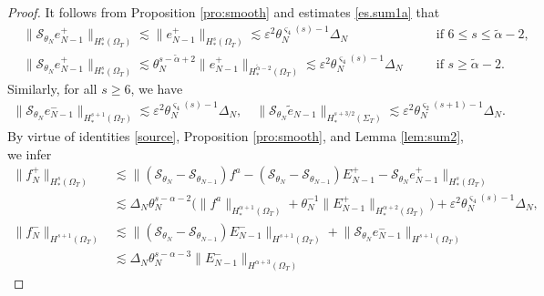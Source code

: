 \documentclass[10pt,a4paper]{amsart}
\begin{document}
\begin{proof}
	It follows from Proposition \ref{pro:smooth} and estimates \eqref{es.sum1a} that
	\begin{align*}
		&	\big\|\mathcal{S}_{\theta_{{N}}} e_{N-1}^+ \big\|_{H_*^s(\Omega_{T})}
		\lesssim 	\big\|  e_{N-1}^+ \big\|_{H_*^s(\Omega_{T})}
		\lesssim \varepsilon^2 \theta_N^{\varsigma_4(s)-1}\varDelta_N
		\quad&& \textrm{if } 6\leq s\leq \widetilde{\alpha}-2,\\
		&	\big\|\mathcal{S}_{\theta_{{N}}} e_{N-1}^+ \big\|_{H_*^s(\Omega_{T})}
		\lesssim \theta_{{N}}^{s-\widetilde{\alpha}+2}	
		\big\|  e_{N-1}^+ \big\|_{H_*^{\widetilde{\alpha}-2}(\Omega_{T})}
		\lesssim \varepsilon^2 \theta_N^{\varsigma_4(s)-1}\varDelta_N
		\quad &&\textrm{if }  s\geq \widetilde{\alpha}-2.
	\end{align*}
	Similarly, for all $s\geq 6$, we have
	\begin{align*}
		\big\|\mathcal{S}_{\theta_{{N}}} e_{N-1}^- \big\|_{H_*^{s+1}(\Omega_{T})}
		\lesssim \varepsilon^2 \theta_N^{\varsigma_4(s)-1}\varDelta_N,
		\quad 	
		\big\|\mathcal{S}_{\theta_{{N}}} \tilde{e}_{N-1}  \big\|_{H_*^{s+3/2}(\Sigma_{T})}
		\lesssim \varepsilon^2 \theta_N^{\varsigma_2(s+1)-1}\varDelta_N.
	\end{align*}
	By virtue of  identities \eqref{source}, Proposition \ref{pro:smooth}, and Lemma \ref{lem:sum2}, we infer
	\begin{align*}
		\big\|f_N^+\big\|_{H_*^{s}(\Omega_{T})}
		&\lesssim
		\big\|(\mathcal{S}_{\theta_{{N}}}-\mathcal{S}_{\theta_{{N}-1}})f^a
		-(\mathcal{S}_{\theta_{{N}}}-\mathcal{S}_{\theta_{{N}-1}})E_{{N}-1}^+
		-\mathcal{S}_{\theta_{{N}}}e_{{N}-1}^+\big\|_{H_*^{s}(\Omega_{T})} \\
		&
		\lesssim \varDelta_{{N}}
		\theta_{{N}}^{s-{\alpha }-2}\big(\big\|f^a\big\|_{H_*^{\alpha +1}(\Omega_{T})}
		+\theta_{{N}}^{-1}\big\|E_{{N}-1}^+\big\|_{H_*^{\alpha +2}(\Omega_{T})} \big)
		+\varepsilon^2 \theta_N^{\varsigma_4(s)-1}\varDelta_N,\\[1mm]
		\big\|f_{{N}}^-\big\|_{H^{s+1}(\Omega_{T})}
		&\lesssim \big\|(\mathcal{S}_{\theta_{{N}}}-\mathcal{S}_{\theta_{{N}-1}})E_{{N}-1}^-\big\|_{H^{s+1}(\Omega_{T})}
		+\big\|\mathcal{S}_{\theta_{{N}}}e_{{N}-1}^-\big\|_{H^{s+1}(\Omega_{T})}\\
		&\lesssim
		\varDelta_{{N}}
		\theta_{{N}}^{s-{\alpha }-3}\big\|E_{{N}-1}^-\big\|_{H^{\alpha+3}(\Omega_{T})}

\end{align*}
\end{proof}
\end{document}
